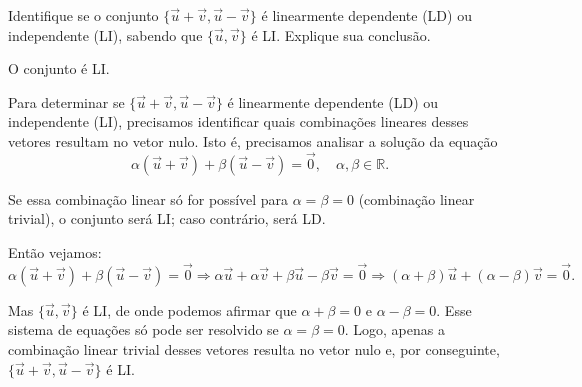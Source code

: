 \begin{question}
	Identifique se o conjunto $\{\vec u + \vec v, \vec u - \vec v\}$ é linearmente dependente (LD) ou independente (LI), sabendo que $\{\vec u, \vec v\}$ é LI.
	Explique sua conclusão.

	\begin{answer}
		O conjunto é LI.
	\end{answer}

	\begin{solution}
		Para determinar se $\{\vec u + \vec v, \vec u - \vec v\}$ é linearmente dependente (LD) ou independente (LI), precisamos identificar quais combinações lineares desses vetores resultam no vetor nulo.
		Isto é, precisamos analisar a solução da equação
		\begin{equation*}
			\alpha \left(\vec u + \vec v\right) + \beta \left(\vec u - \vec v\right) = \vec 0,
			\quad \alpha, \beta \in \mathbb{R}.
		\end{equation*}

		Se essa combinação linear só for possível para $\alpha = \beta = 0$ (combinação linear trivial), o conjunto será LI; caso contrário, será LD.

		Então vejamos:
		\begin{equation*}
			\alpha (\vec u + \vec v) + \beta (\vec u - \vec v) = \vec 0 \Rightarrow
			\alpha\vec u + \alpha\vec v + \beta\vec u - \beta\vec v = \vec 0 \Rightarrow
			(\alpha+\beta)\vec u + (\alpha-\beta)\vec v = \vec 0.
		\end{equation*}

		Mas $\{\vec u,\vec v\}$ é LI, de onde podemos afirmar que $\alpha + \beta = 0$ e $\alpha - \beta = 0$.
		Esse sistema de equações só pode ser resolvido se $\alpha = \beta = 0$.
		Logo, apenas a combinação linear trivial desses vetores resulta no vetor nulo e, por conseguinte, $\{\vec u + \vec v, \vec u - \vec v\}$ é LI.
	\end{solution}
\end{question}


